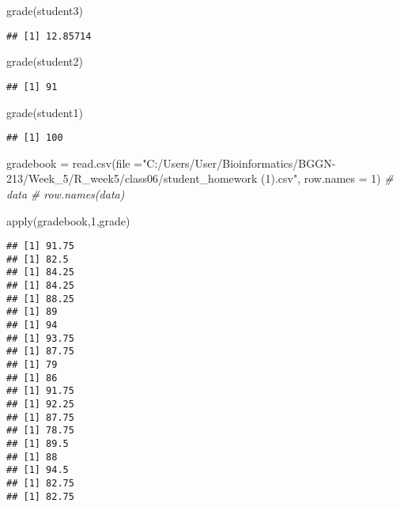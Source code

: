 \documentclass[
]{article}
\newenvironment{Shaded}{\begin{snugshade}}{\end{snugshade}}
\newcommand{\AttributeTok}[1]{\textcolor[rgb]{0.77,0.63,0.00}{#1}}
\newcommand{\CommentTok}[1]{\textcolor[rgb]{0.56,0.35,0.01}{\textit{#1}}}
\newcommand{\DecValTok}[1]{\textcolor[rgb]{0.00,0.00,0.81}{#1}}
\newcommand{\FunctionTok}[1]{\textcolor[rgb]{0.00,0.00,0.00}{#1}}
\newcommand{\NormalTok}[1]{#1}
\newcommand{\OtherTok}[1]{\textcolor[rgb]{0.56,0.35,0.01}{#1}}
\newcommand{\StringTok}[1]{\textcolor[rgb]{0.31,0.60,0.02}{#1}}
\begin{document}
\begin{Shaded}
\begin{Highlighting}[]
\FunctionTok{grade}\NormalTok{(student3)}
\end{Highlighting}
\end{Shaded}

\begin{verbatim}
## [1] 12.85714
\end{verbatim}

\begin{Shaded}
\begin{Highlighting}[]
\FunctionTok{grade}\NormalTok{(student2)}
\end{Highlighting}
\end{Shaded}

\begin{verbatim}
## [1] 91
\end{verbatim}

\begin{Shaded}
\begin{Highlighting}[]
\FunctionTok{grade}\NormalTok{(student1)}
\end{Highlighting}
\end{Shaded}

\begin{verbatim}
## [1] 100
\end{verbatim}

\begin{Shaded}
\begin{Highlighting}[]
\NormalTok{gradebook }\OtherTok{=} \FunctionTok{read.csv}\NormalTok{(}\AttributeTok{file =}\StringTok{"C:/Users/User/Bioinformatics/BGGN{-}213/Week\_5/R\_week5/class06/student\_homework (1).csv"}\NormalTok{, }\AttributeTok{row.names =} \DecValTok{1}\NormalTok{)}
\CommentTok{\# data}
\CommentTok{\# row.names(data)}
\end{Highlighting}
\end{Shaded}

\begin{Shaded}
\begin{Highlighting}[]
\FunctionTok{apply}\NormalTok{(gradebook,}\DecValTok{1}\NormalTok{,grade)}
\end{Highlighting}
\end{Shaded}

\begin{verbatim}
## [1] 91.75
## [1] 82.5
## [1] 84.25
## [1] 84.25
## [1] 88.25
## [1] 89
## [1] 94
## [1] 93.75
## [1] 87.75
## [1] 79
## [1] 86
## [1] 91.75
## [1] 92.25
## [1] 87.75
## [1] 78.75
## [1] 89.5
## [1] 88
## [1] 94.5
## [1] 82.75
## [1] 82.75
\end{verbatim}
\end{document}
